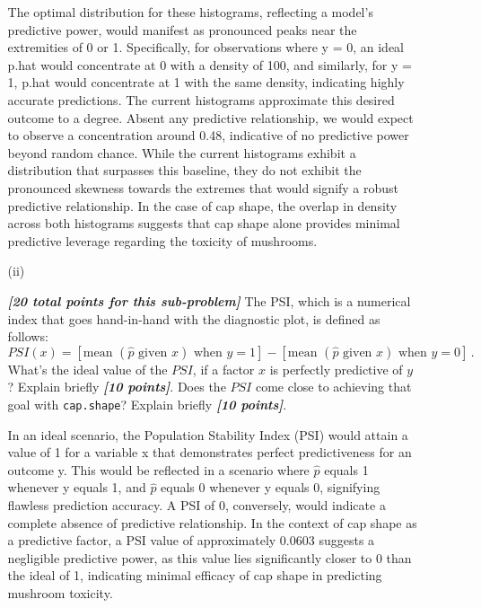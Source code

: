 \documentclass[12pt]{article}
\newcommand{\bi}[1]{\b{\i{#1}}}
\renewcommand{\b}[1]{\textbf{#1}}
\renewcommand{\i}[1]{\textit{#1}}
\begin{document}
\begin{itemize}
\begin{itemize}
{\color{blue}
The optimal distribution for these histograms, reflecting a model's predictive power, would manifest as pronounced peaks near the extremities of 0 or 1. Specifically, for observations where y = 0, an ideal p.hat would concentrate at 0 with a density of 100, and similarly, for y = 1, p.hat would concentrate at 1 with the same density, indicating highly accurate predictions. The current histograms approximate this desired outcome to a degree. Absent any predictive relationship, we would expect to observe a concentration around 0.48, indicative of no predictive power beyond random chance. While the current histograms exhibit a distribution that surpasses this baseline, they do not exhibit the pronounced skewness towards the extremes that would signify a robust predictive relationship. In the case of cap shape, the overlap in density across both histograms suggests that cap shape alone provides minimal predictive leverage regarding the toxicity of mushrooms.
}

\item[(ii)]

\bi{[20 total points for this sub-problem]} The PSI, which is a numerical index that goes hand-in-hand with the diagnostic plot, is defined as follows:
\begin{equation} \label{e:psi-1}
PSI ( x ) = [ \textrm{mean } ( \hat{ p } \textrm{ given } x ) \textrm{ when } y = 1 ] - [ \textrm{mean } ( \hat{ p } \textrm{ given } x ) \textrm{ when } y = 0 ] \, .
\end{equation}
What's the ideal value of the $PSI$, if a factor $x$ is perfectly predictive of $y$? Explain briefly \bi{[10 points]}. Does the $PSI$ come close to achieving that goal with \texttt{cap.shape}? Explain briefly \bi{[10 points]}.

{\color{blue}
In an ideal scenario, the Population Stability Index (PSI) would attain a value of 1 for a variable x that demonstrates perfect predictiveness for an outcome y. This would be reflected in a scenario where \(\hat{p}\) equals 1 whenever y equals 1, and \(\hat{p}\) equals 0 whenever y equals 0, signifying flawless prediction accuracy. A PSI of 0, conversely, would indicate a complete absence of predictive relationship. In the context of cap shape as a predictive factor, a PSI value of approximately 0.0603 suggests a negligible predictive power, as this value lies significantly closer to 0 than the ideal of 1, indicating minimal efficacy of cap shape in predicting mushroom toxicity.
}
\end{itemize}


\end{itemize}
\end{document}
